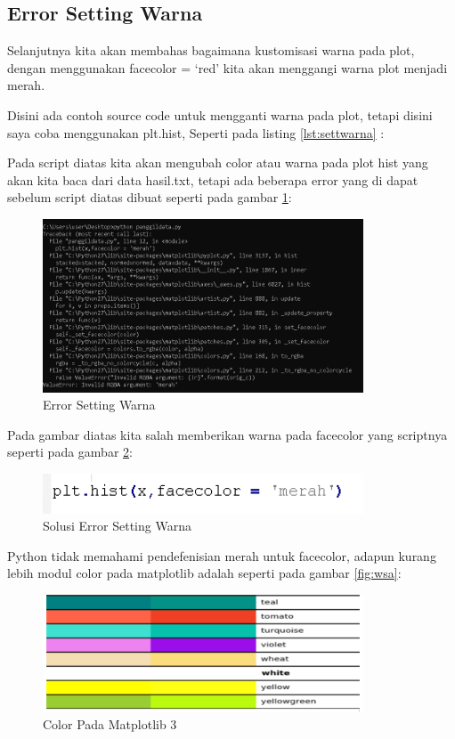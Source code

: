 \subsection{Error Setting Warna}
Selanjutnya kita akan membahas bagaimana kustomisasi warna pada plot, dengan menggunakan facecolor = ‘red’ kita akan menggangi warna plot menjadi merah.

Disini ada contoh source code untuk mengganti warna pada plot, tetapi disini saya coba menggunakan plt.hist, Seperti pada listing \ref{lst:settwarna} : 


Pada script diatas kita akan mengubah color atau warna pada plot hist yang akan kita baca dari data hasil.txt, tetapi ada beberapa error yang di dapat sebelum script diatas dibuat seperti pada gambar \ref{fig:errsetwar}:
\begin{figure}[!htbp]
	\centerline{\includegraphics[width=0.85\textwidth]{figures/6/errsetwar.PNG}}
	\caption{Error Setting Warna}
	\label{fig:errsetwar}
\end{figure}   

Pada gambar diatas kita salah memberikan warna pada facecolor yang scriptnya seperti pada gambar \ref{fig:solesw}:
\begin{figure}[!htbp]
	\centerline{\includegraphics[width=0.85\textwidth]{figures/6/solesw.PNG}}
	\caption{Solusi Error Setting Warna}
	\label{fig:solesw}
\end{figure}   

Python tidak memahami pendefenisian merah untuk facecolor, adapun kurang lebih modul color pada matplotlib adalah seperti pada gambar \ref{fig:wsa}:
\begin{figure}[!htbp]
	\centerline{\includegraphics[width=0.85\textwidth]{figures/6/wti.PNG}}
	\caption{Color Pada Matplotlib 3}
	\label{fig:wti}
\end{figure}   

